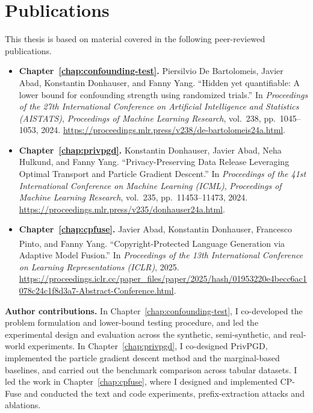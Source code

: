 \chapter*{Publications}

This thesis is based on material covered in the following peer-reviewed publications.

\begin{itemize}[leftmargin=*]

  \item \textbf{Chapter~\ref{chap:confounding-test}.}
  Piersilvio De Bartolomeis\equalcontributionmark,
  Javier Abad\equalcontributionmark,
  Konstantin Donhauser, and Fanny Yang.
  ``Hidden yet quantifiable: A lower bound for confounding
  strength using randomized trials.''
  In \emph{Proceedings of the 27th International Conference
  on Artificial Intelligence and Statistics (AISTATS)},
  \emph{Proceedings of Machine Learning Research},
  vol.~238, pp.~1045--1053, 2024.
  \url{https://proceedings.mlr.press/v238/de-bartolomeis24a.html}.

  \item \textbf{Chapter~\ref{chap:privpgd}.}
  Konstantin Donhauser\equalcontributionmark,
  Javier Abad\equalcontributionmark,
  Neha Hulkund, and Fanny Yang.
  ``Privacy-Preserving Data Release Leveraging Optimal
  Transport and Particle Gradient Descent.''
  In \emph{Proceedings of the 41st International Conference
  on Machine Learning (ICML)},
  \emph{Proceedings of Machine Learning Research},
  vol.~235, pp.~11453--11473, 2024.
  \url{https://proceedings.mlr.press/v235/donhauser24a.html}.

  \item \textbf{Chapter~\ref{chap:cpfuse}.}
  Javier Abad, Konstantin Donhauser,
  Francesco Pinto\textsuperscript{\dag},
  and Fanny Yang\textsuperscript{\dag}.
  ``Copyright-Protected Language Generation via Adaptive Model Fusion.''
  In \emph{Proceedings of the 13th International Conference
  on Learning Representations (ICLR)}, 2025.
  \url{https://proceedings.iclr.cc/paper_files/paper/2025/hash/01953220e4becc6ac1078c24c1f8d3a7-Abstract-Conference.html}.

\end{itemize}

\noindent\equalcontributionnote{}

\bigskip
\noindent\textbf{Author contributions.} In Chapter~\ref{chap:confounding-test}, I co-developed the problem formulation and lower-bound testing procedure, and led the experimental design and evaluation across the synthetic, semi-synthetic, and real-world experiments. In Chapter~\ref{chap:privpgd}, I co-designed PrivPGD, implemented the particle gradient descent method and the marginal-based baselines, and carried out the benchmark comparison across tabular datasets. I led the work in Chapter~\ref{chap:cpfuse}, where I designed and implemented CP-Fuse and conducted the text and code experiments, prefix-extraction attacks and ablations.
